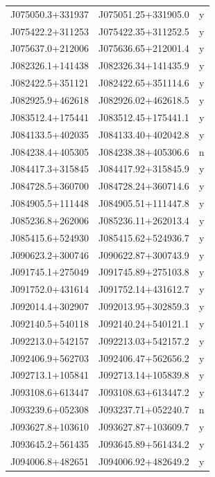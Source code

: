 \begin{table}
\begin{tabular}{ccc}
        J075050.3+331937 & J075051.25+331905.0 & y\\
        J075422.2+311253 & J075422.35+311252.5 & y\\
        J075637.0+212006 & J075636.65+212001.4 & y\\
        J082326.1+141438 & J082326.34+141435.9 & y\\
        J082422.5+351121 & J082422.65+351114.6 & y\\
        J082925.9+462618 & J082926.02+462618.5 & y\\
        J083512.4+175441 & J083512.45+175441.1 & y\\
        J084133.5+402035 & J084133.40+402042.8 & y\\
        J084238.4+405305 & J084238.38+405306.6 & n\\
        J084417.3+315845 & J084417.92+315845.9 & y\\
        J084728.5+360700 & J084728.24+360714.6 & y\\
        J084905.5+111448 & J084905.51+111447.8 & y\\
        J085236.8+262006 & J085236.11+262013.4 & y\\
        J085415.6+524930 & J085415.62+524936.7 & y\\
        J090623.2+300746 & J090622.87+300743.9 & y\\
        J091745.1+275049 & J091745.89+275103.8 & y\\
        J091752.0+431614 & J091752.14+431612.7 & y\\
        J092014.4+302907 & J092013.95+302859.3 & y\\
        J092140.5+540118 & J092140.24+540121.1 & y\\
        J092213.0+542157 & J092213.03+542157.2 & y\\
        J092406.9+562703 & J092406.47+562656.2 & y\\
        J092713.1+105841 & J092713.14+105839.8 & y\\
        J093108.6+613447 & J093108.63+613447.2 & y\\
        J093239.6+052308 & J093237.71+052240.7 & n\\
        J093627.8+103610 & J093627.87+103609.7 & y\\
        J093645.2+561435 & J093645.89+561434.2 & y\\
        J094006.8+482651 & J094006.92+482649.2 & y\\\hline\hline
  \end{tabular}
  \begin{tabular}{ccc}

\end{tabular}
\end{table}
